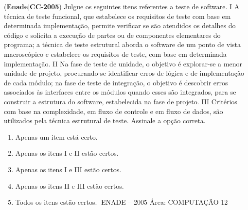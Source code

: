 \documentclass{exam}
\begin{document}
\begin{questions}
\question (\textbf{Enade}$|$\textbf{CC}-\textbf{2005}) Julgue os seguintes itens referentes a teste de software.
I A técnica de teste funcional, que estabelece os requisitos de
teste com base em determinada implementação, permite
verificar se são atendidos os detalhes do código e solicita a
execução de partes ou de componentes elementares do
programa; a técnica de teste estrutural aborda o software de
um ponto de vista macroscópico e estabelece os requisitos
de teste, com base em determinada implementação.
II Na fase de teste de unidade, o objetivo é explorar-se a
menor unidade de projeto, procurando-se identificar erros de
lógica e de implementação de cada módulo; na fase de teste
de integração, o objetivo é descobrir erros associados às
interfaces entre os módulos quando esses são integrados,
para se construir a estrutura do software, estabelecida na
fase de projeto.
III Critérios com base na complexidade, em fluxo de controle
e em fluxo de dados, são utilizados pela técnica estrutural de
teste.
Assinale a opção correta.
	\begin{enumerate}[label=\alph*)]
		\item  Apenas um item está certo.
		\item  Apenas os itens I e II estão certos.
		\item  Apenas os itens I e III estão certos.
		\item  Apenas os itens II e III estão certos.
		\item  Todos os itens estão certos.
ENADE – 2005 Área: COMPUTAÇÃO 12

	\end{enumerate}


\end{questions}
\end{document}
